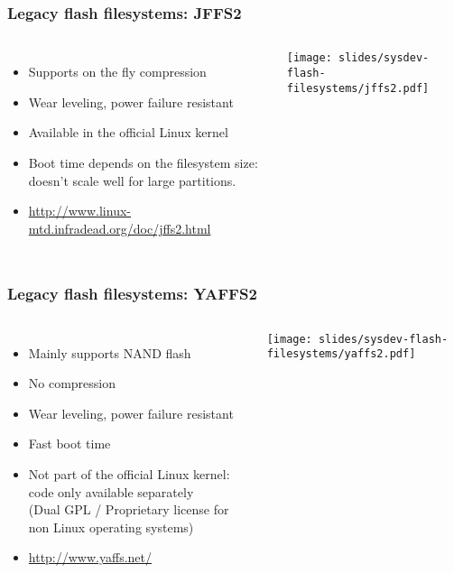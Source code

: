 \begin{frame}
  \frametitle{Legacy flash filesystems: JFFS2}
  \begin{columns}
    \begin{itemize}
    \item Supports on the fly compression
    \item Wear leveling, power failure resistant
    \item Available in the official Linux kernel
    \item Boot time depends on the filesystem size: doesn't scale well
      for large partitions.
    \item \url{http://www.linux-mtd.infradead.org/doc/jffs2.html}
    \end{itemize}
    \texttt{[image: slides/sysdev-flash-filesystems/jffs2.pdf]}
  \end{columns}
\end{frame}

\begin{frame}
  \frametitle{Legacy flash filesystems: YAFFS2}
  \begin{columns}
    \begin{itemize}
    \item Mainly supports NAND flash
    \item No compression
    \item Wear leveling, power failure resistant
    \item Fast boot time
    \item Not part of the official Linux kernel: code only available
      separately\\
      (Dual GPL / Proprietary license for non Linux operating systems)
    \item \url{http://www.yaffs.net/}
    \end{itemize}
    \texttt{[image: slides/sysdev-flash-filesystems/yaffs2.pdf]}
  \end{columns}
\end{frame}


